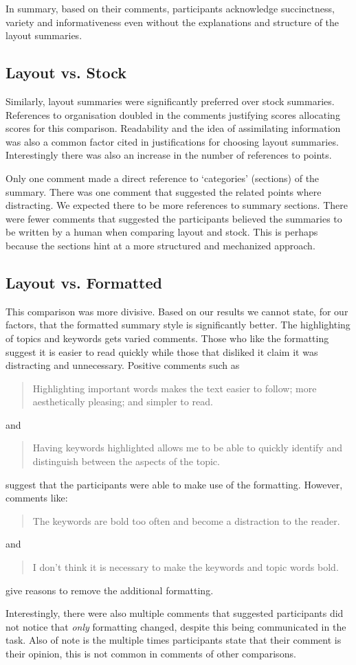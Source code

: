       In summary, based on their comments, participants acknowledge succinctness, variety and informativeness even without the explanations and structure of the layout summaries.

    \subsection{Layout vs. Stock}
      Similarly, layout summaries were significantly preferred over stock summaries. References to organisation doubled in the comments justifying scores allocating scores for this comparison. Readability and the idea of assimilating information was also a common factor cited in justifications for choosing layout summaries. Interestingly there was also an increase in the number of references to points.

      Only one comment made a direct reference to `categories' (sections) of the summary. There was one comment that suggested the related points where distracting. We expected there to be more references to summary sections. There were fewer comments that suggested the participants believed the summaries to be written by a human when comparing layout and stock. This is perhaps because the sections hint at a more structured and mechanized approach.

    \subsection{Layout vs. Formatted}
      This comparison was more divisive. Based on our results we cannot state, for our factors, that the formatted summary style is significantly better. The highlighting of topics and keywords gets varied comments. Those who like the formatting suggest it is easier to read quickly while those that disliked it claim it was distracting and unnecessary. Positive comments such as \blockquote{Highlighting important words makes the text easier to follow; more aesthetically pleasing; and simpler to read.} and \blockquote{Having keywords highlighted allows me to be able to quickly identify and distinguish between the aspects of the topic.} suggest that the participants were able to make use of the formatting. However, comments like: \blockquote{The keywords are bold too often and become a distraction to the reader.} and \blockquote{I don't think it is necessary to make the keywords and topic words bold.} give reasons to remove the additional formatting.

      Interestingly, there were also multiple comments that suggested participants did not notice that \textit{only} formatting changed, despite this being communicated in the task. Also of note is the multiple times participants state that their comment is their opinion, this is not common in comments of other comparisons.

